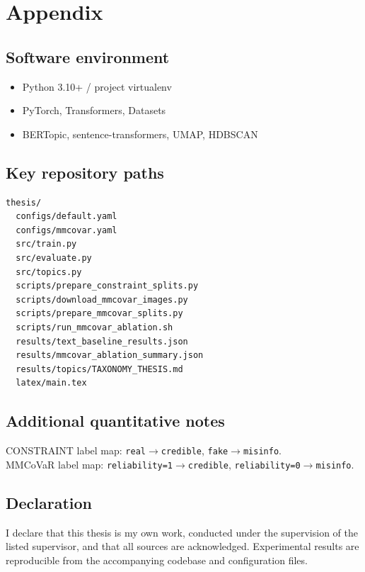 \chapter{Appendix}
\label{ch:appendix}

\section{Software environment}

\begin{itemize}
  \item Python 3.10+ / project virtualenv
  \item PyTorch, Transformers, Datasets
  \item BERTopic, sentence-transformers, UMAP, HDBSCAN
\end{itemize}

\section{Key repository paths}

\begin{verbatim}
thesis/
  configs/default.yaml
  configs/mmcovar.yaml
  src/train.py
  src/evaluate.py
  src/topics.py
  scripts/prepare_constraint_splits.py
  scripts/download_mmcovar_images.py
  scripts/prepare_mmcovar_splits.py
  scripts/run_mmcovar_ablation.sh
  results/text_baseline_results.json
  results/mmcovar_ablation_summary.json
  results/topics/TAXONOMY_THESIS.md
  latex/main.tex
\end{verbatim}

\section{Additional quantitative notes}

CONSTRAINT label map: \texttt{real}$\rightarrow$\texttt{credible}, \texttt{fake}$\rightarrow$\texttt{misinfo}.\\
MMCoVaR label map: \texttt{reliability=1}$\rightarrow$\texttt{credible}, \texttt{reliability=0}$\rightarrow$\texttt{misinfo}.

\section{Declaration}

I declare that this thesis is my own work, conducted under the supervision of the listed supervisor, and that all sources are acknowledged.
Experimental results are reproducible from the accompanying codebase and configuration files.
